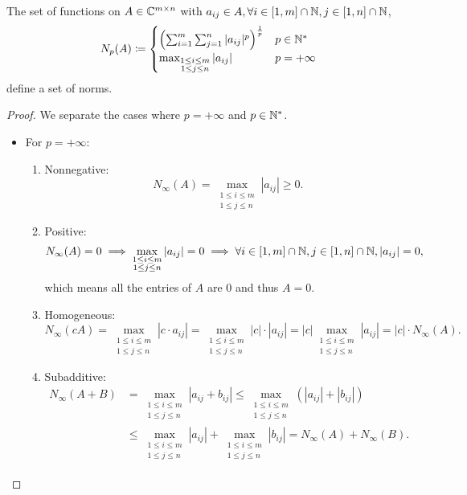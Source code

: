 \begin{theorem}
The set of functions on \(A\in\mathbb{C}^{m\times n}\) with \(a_{ij}\in A,\forall i\in[1,m]\cap\mathbb{N},j\in[1,n]\cap\mathbb{N}\),
\begin{equation}\label{matrixnorm}
N_p(A)\coloneqq
\begin{cases} 
\left(\sum_{i=1}^m\sum_{j=1}^n |a_{ij}|^p\right)^{\frac{1}{p}} & p\in\mathbb{N}^*\\
\max_{\substack{1\leq i\leq m\\ 1\leq j\leq n}}|a_{ij}| & p=+\infty
\end{cases}
\end{equation}
define a set of norms.
\end{theorem}
\begin{proof}
We separate the cases where \(p=+\infty\) and \(p\in\mathbb{N}^*\).
\begin{itemize}
	\item For \(p=+\infty\):
	\begin{enumerate}%
		\item Nonnegative:
		\[N_\infty(A)=\max_{\substack{1\leq i\leq m\\ 1\leq j\leq n}}|a_{ij}|\ge0. \]
		\item Positive:
		\[N_\infty(A)=0\implies\max_{\substack{1\leq i\leq m\\ 1\leq j\leq n}}|a_{ij}|=0\implies \forall i\in[1,m]\cap\mathbb{N},j\in[1,n]\cap\mathbb{N},|a_{ij}|=0, \]
		which means all the entries of $A$ are 0 and thus \(A=0\).
		\item Homogeneous:
		\[ N_\infty(cA)=\max_{\substack{1\leq i\leq m\\ 1\leq j\leq n}}|c\cdot a_{ij}|=\max_{\substack{1\leq i\leq m\\ 1\leq j\leq n}}|c|\cdot|a_{ij}|=|c|\max_{\substack{1\leq i\leq m\\ 1\leq j\leq n}}|a_{ij}|=|c|\cdot N_\infty(A). \]
		\item Subadditive:
		\begin{align*}
		N_\infty(A+B)&=\max_{\substack{1\leq i\leq m\\ 1\leq j\leq n}}|a_{ij}+b_{ij}|\leq\max_{\substack{1\leq i\leq m\\ 1\leq j\leq n}}(|a_{ij}|+|b_{ij}|)\\
		&\leq\max_{\substack{1\leq i\leq m\\ 1\leq j\leq n}}|a_{ij}|+\max_{\substack{1\leq i\leq m\\ 1\leq j\leq n}}|b_{ij}|=N_\infty(A)+N_\infty(B).
		\end{align*}
	\end{enumerate}

\end{itemize}
\end{proof}
